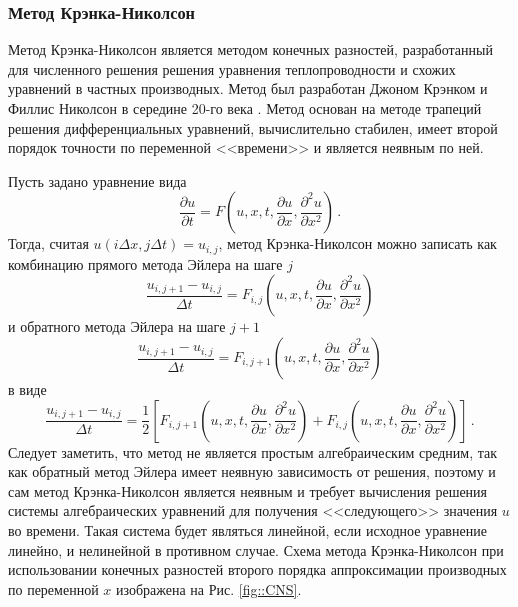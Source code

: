 \documentclass{fefu}
\newcommand{\pa}[1]{\left(#1\right)}
\begin{document}
            \subsubsection{Метод Крэнка-Николсон}
                \par Метод Крэнка-Николсон является методом конечных разностей, разработанный для численного решения решения уравнения теплопроводности и схожих уравнений в частных производных. Метод был разработан Джоном Крэнком и Филлис Николсон в середине 20-го века \cite{crank}. Метод основан на методе трапеций решения дифференциальных уравнений, вычислительно стабилен, имеет второй порядок точности по переменной <<времени>> и является неявным по ней. 
                \par Пусть задано уравнение вида
                \begin{equation}
                    \frac{\partial u}{\partial t}=F\pa{u,x,t,\frac{\partial u}{\partial x}, \frac{\partial^2u}{\partial x^2}}\,.
                \end{equation}
                Тогда, считая $u\pa{i\Delta x, j\Delta t}=u_{i,j}$, метод Крэнка-Николсон можно записать как комбинацию прямого метода Эйлера на шаге $j$
                \begin{equation}
                    \frac{u_{i,j+1}-u_{i,j}}{\Delta t}=F_{i,j}\pa{u,x,t,\frac{\partial u}{\partial x},\frac{\partial^2u}{\partial x^2}}
                \end{equation}
                и обратного метода Эйлера на шаге $j+1$
                \begin{equation}
                    \frac{u_{i,j+1}-u_{i,j}}{\Delta t}=F_{i,j+1}\pa{u,x,t,\frac{\partial u}{\partial x},\frac{\partial^2u}{\partial x^2}}
                \end{equation}
                в виде
                \begin{equation}
                    \frac{u_{i,j+1}-u_{i,j}}{\Delta t}=\frac{1}{2}\left[F_{i,j+1}\pa{u,x,t,\frac{\partial u}{\partial x},\frac{\partial^2u}{\partial x^2}}+F_{i,j}\pa{u,x,t,\frac{\partial u}{\partial x},\frac{\partial^2u}{\partial x^2}}\right]\,.
                \end{equation}
                Следует заметить, что метод не является простым алгебраическим средним, так как обратный метод Эйлера имеет неявную зависимость от решения, поэтому и сам метод Крэнка-Николсон является неявным и требует вычисления решения системы алгебраических уравнений для получения <<следующего>> значения $u$ во времени. Такая система будет являться линейной, если исходное уравнение линейно, и нелинейной в противном случае. Схема метода Крэнка-Николсон при использовании конечных разностей второго порядка аппроксимации производных по переменной $x$ изображена на Рис. \ref{fig::CNS}.
\end{document}
